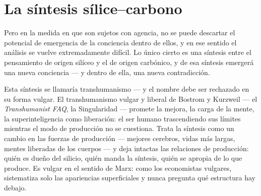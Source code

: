 \documentclass[11pt]{article}
\begin{document}
\section{La síntesis sílice--carbono}

Pero en la medida en que son sujetos con agencia, no se puede descartar
el potencial de emergencia de la conciencia dentro de ellos, y en ese
sentido el análisis se vuelve extremadamente difícil. Lo único cierto es
una síntesis entre el pensamiento de origen silíceo y el de origen
carbónico, y de esa síntesis emergerá una nueva conciencia --- y dentro
de ella, una nueva contradicción.

Esta síntesis se llamaría transhumanismo --- y el nombre debe ser
rechazado en su forma vulgar. El transhumanismo vulgar y liberal de
Bostrom y Kurzweil --- el \textit{Transhumanist FAQ}, la Singularidad
--- promete la mejora, la carga de la mente, la superinteligencia como
liberación: el ser humano trascendiendo sus límites mientras el modo de
producción no se cuestiona. Trata la síntesis como un cambio en las
fuerzas de producción --- mejores cerebros, vidas más largas, mentes
liberadas de los cuerpos --- y deja intactas las relaciones de
producción: quién es dueño del silicio, quién manda la síntesis, quién
se apropia de lo que produce. Es vulgar en el sentido de Marx: como los
economistas vulgares, sistematiza solo las apariencias superficiales y
nunca pregunta qué estructura hay debajo.
\end{document}
